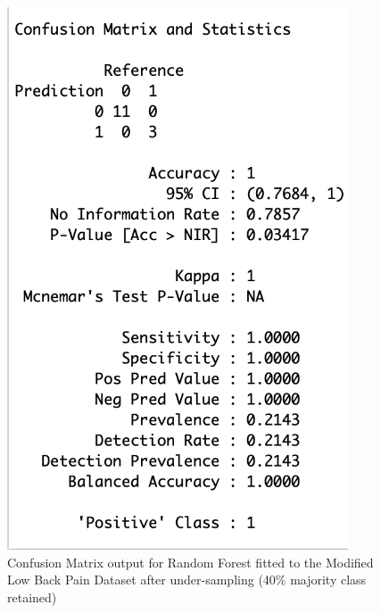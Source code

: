 \begin{figure}[!htbp]
\begin{minipage}{0.45\textwidth}
        \includegraphics[width=0.9\textwidth]{ThesisTemplate/appendix/images/Chapter5Appendix/ConfusionMatrix40/modLBP.png}
        \caption{Confusion Matrix output for Random Forest fitted to the Modified Low Back Pain Dataset after under-sampling (40\% majority class retained)}
        \label{fig:my_label}
    \end{minipage}
\end{figure}


